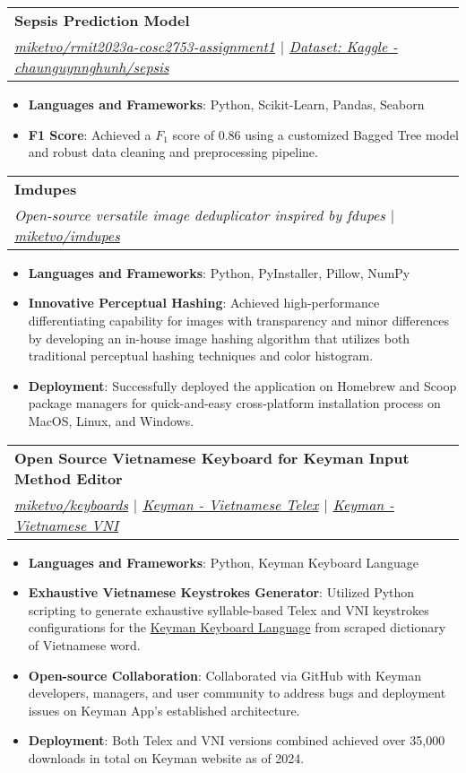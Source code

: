 \documentclass[a4paper,11pt]{article}
\makeatletter
\newcommand{\resumeItem}[2]{
  \item\small{
    \textbf{#1}{: #2 \vspace{-2pt}}
  }
}
\newcommand{\resumeSubheading}[4]{
  \vspace{-1pt}\item
    \begin{tabular*}{0.97\textwidth}{l@{\extracolsep{\fill}}r}
      \textbf{#1} & #2 \\
      \textit{\small#3} & \textit{\small #4} \\
    \end{tabular*}\vspace{-5pt}
}
\newcommand{\resumeItemListStart}{\begin{itemize}}
\newcommand{\resumeItemListEnd}{\end{itemize}\vspace{-5pt}}
\makeatother
\begin{document}
    \resumeSubheading
      {Sepsis Prediction Model}{}
      {\href{https://github.com/miketvo/rmit2023a-cosc2753-assignment1}{\faGithub\space miketvo/rmit2023a-cosc2753-assignment1} $|$ \href{https://www.kaggle.com/datasets/chaunguynnghunh/sepsis/}{\faDatabase\space Dataset: Kaggle - chaunguynnghunh/sepsis}}{}
      \resumeItemListStart
        \resumeItem{Languages and Frameworks}
          {Python, Scikit-Learn, Pandas, Seaborn}
        \resumeItem{F1 Score}
          {Achieved a $F_1$ score of 0.86 using a customized Bagged Tree model and robust data cleaning and preprocessing pipeline.}
      \resumeItemListEnd

    \resumeSubheading
      {Imdupes}{}
      {Open-source versatile image deduplicator inspired by fdupes $|$ \href{https://github.com/miketvo/imdupes}{\faGithub\space miketvo/imdupes}}{}
      \resumeItemListStart
        \resumeItem{Languages and Frameworks}
          {Python, PyInstaller, Pillow, NumPy}
        \resumeItem{Innovative Perceptual Hashing}
          {Achieved high-performance differentiating capability for images with transparency and minor differences by developing an in-house image hashing algorithm that utilizes both traditional perceptual hashing techniques and color histogram.}
        \resumeItem{Deployment}
          {Successfully deployed the application on Homebrew and Scoop package managers for quick-and-easy cross-platform installation process on MacOS, Linux, and Windows.}
      \resumeItemListEnd

    \resumeSubheading
      {Open Source Vietnamese Keyboard for Keyman Input Method Editor}{}
      {\href{https://github.com/miketvo/keyboards}{\faGithub\space miketvo/keyboards} $|$ \href{https://keyman.com/keyboards/vietnamese_telex}{\faGlobe\space Keyman - Vietnamese Telex} $|$ \href{https://keyman.com/keyboards/vietnamese_vni}{\faGlobe\space Keyman - Vietnamese VNI}}{}
      \resumeItemListStart
        \resumeItem{Languages and Frameworks}
          {Python, Keyman Keyboard Language}
        \resumeItem{Exhaustive Vietnamese Keystrokes Generator}
          {Utilized Python scripting to generate exhaustive syllable-based Telex and VNI keystrokes configurations for the \href{https://help.keyman.com/developer/language/}{Keyman Keyboard Language} from scraped dictionary of Vietnamese word.}
        \resumeItem{Open-source Collaboration}
          {Collaborated via GitHub with Keyman developers, managers, and user community to address bugs and deployment issues on Keyman App's established architecture.}
        \resumeItem{Deployment}
          {Both Telex and VNI versions combined achieved over 35,000 downloads in total on Keyman website as of 2024.}
      \resumeItemListEnd
\end{document}
